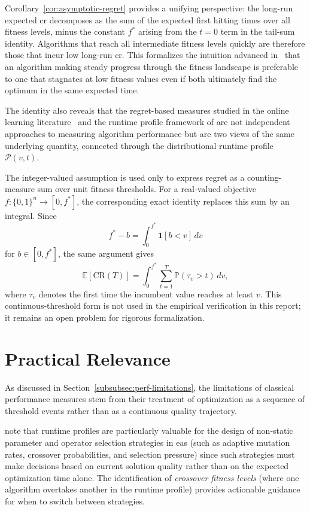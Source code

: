 Corollary~\ref{cor:asymptotic-regret} provides a unifying
perspective: the long-run
expected \acrshort{cr} decomposes as the sum of the expected
first hitting times
over all fitness levels, minus the constant $f^*$ arising from the $t
= 0$ term in the
tail-sum identity. Algorithms that reach all intermediate fitness
levels quickly are
therefore those that incur low long-run \acrshort{cr}. This formalizes
the intuition advanced in~\cite{pinto2018practice} that an algorithm
making steady
progress through the fitness landscape is preferable to one that
stagnates at low
fitness values even if both ultimately find the optimum in the same
expected time.

The identity also reveals that the regret-based measures studied in
the online learning
literature~\cite{cesa2006prediction} and the runtime profile framework
of \citet{pinto2018practice} are not independent approaches to
measuring algorithm
performance but are two views of the same underlying quantity,
connected through the
distributional runtime profile $\mathcal{P}(v, t)$.

\begin{remark}
  \label{rem:real-valued-objectives}
  The integer-valued assumption is used only to express regret as a
  counting-measure sum over unit fitness thresholds. For a real-valued
  objective \(f : \{0,1\}^n \to [0,f^*]\), the corresponding exact identity
  replaces this sum by an integral. Since
  \[
    f^* - b = \int_0^{f^*} \mathbf{1}[b < v]\,dv
  \]
  for \(b \in [0,f^*]\), the same argument gives
  \[
    \mathbb{E}[\mathrm{CR}(T)]
    =
    \int_0^{f^*} \sum_{t=1}^{T}
    \mathbb{P}(\tau_v > t)\,dv,
  \]
  where \(\tau_v\) denotes the first time the incumbent value reaches at
  least \(v\). This continuous-threshold form is not used in the empirical
  verification in this report; it remains an open problem for rigorous formalization.
\end{remark}

\section{Practical Relevance}
\label{subsec:profiles-relevance}

As discussed in Section~\ref{subsubsec:perf-limitations}, the limitations of
classical performance measures stem from their treatment of optimization as a
sequence of threshold events rather than as a continuous quality trajectory.

\citet{pinto2018practice} note that runtime profiles
are particularly
valuable for the design of non-static parameter and operator
selection strategies in
\acrshort{ea}s (such as adaptive mutation rates, crossover
  probabilities, and selection
pressure) since such strategies must make decisions based on current
solution quality
rather than on the expected optimization time alone. The identification of
\emph{crossover fitness levels} (where one algorithm overtakes
  another in the runtime
profile) provides actionable guidance for when to switch between strategies.

